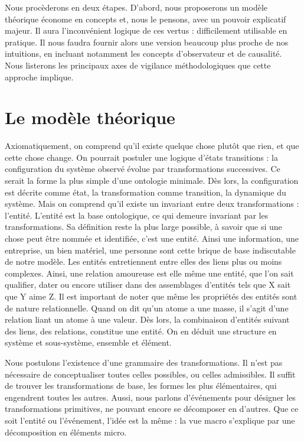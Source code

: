 \documentclass[11pt]{article}
\begin{document}
	\vspace{0.5cm}
	Nous procèderons en deux étapes. D'abord, nous proposerons un modèle théorique économe en concepts et, nous le pensons, avec un pouvoir explicatif majeur. Il aura l'inconvénient logique de ces vertus : difficilement utilisable en pratique. Il nous faudra fournir alors une version beaucoup plus proche de nos intuitions, en incluant notamment les concepts d'observateur et de causalité. Nous listerons les principaux axes de vigilance méthodologiques que cette approche implique. 
	
	
	\section{Le modèle théorique}
	
	Axiomatiquement, on comprend qu'il existe quelque chose plutôt que rien, et que cette chose change. On pourrait postuler une logique d'états transitions : la configuration du système observé évolue par transformations successives. Ce serait la forme la plus simple d'une ontologie minimale. Dès lors, la configuration est décrite comme état, la transformation comme transition, la dynamique du système. Mais on comprend qu'il existe un invariant entre deux transformations : l'entité. L'entité est la base ontologique, ce qui demeure invariant par les transformations. Sa définition reste la plus large possible, à savoir que si une chose peut être nommée et identifiée, c'est une entité. Ainsi une information, une entreprise, un bien matériel, une personne sont cette brique de base indiscutable de notre modèle. Les entités entretiennent entre elles des liens plus ou moins complexes. Ainsi, une relation amoureuse est elle même une entité, que l'on sait qualifier, dater ou encore utiliser dans des assemblages d'entités tels que \og{}X sait que Y aime Z\fg{}. Il est important de noter que même les propriétés des entités sont de nature relationnelle. Quand on dit qu'un atome a une masse, il s'agit d'une relation liant un atome à une valeur. Dès lors, la combinaison d'entités suivant des liens, des relations, constitue une entité. On en déduit une structure en système et sous-système, ensemble et élément.
	

	Nous postulons l'existence d'une grammaire des transformations. Il n'est pas nécessaire de conceptualiser toutes celles possibles, ou celles admissibles. Il suffit de trouver les transformations de base, les formes les plus élémentaires, qui engendrent toutes les autres. Aussi, nous parlons d'événements pour désigner les transformations primitives, ne pouvant encore se décomposer en d'autres. Que ce soit l'entité ou l'événement, l'idée est la même : la vue macro s'explique par une décomposition en éléments micro. 
	
\end{document}
